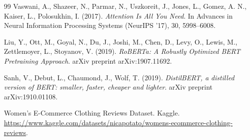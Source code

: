 \begin{thebibliography}{99}
Vaswani, A., Shazeer, N., Parmar, N., Uszkoreit, J., Jones, L., Gomez, A. N., Kaiser, L., Polosukhin, I. (2017). \textit{Attention Is All You Need}. In Advances in Neural Information Processing Systems (NeurIPS '17), 30, 5998--6008.

Liu, Y., Ott, M., Goyal, N., Du, J., Joshi, M., Chen, D., Levy, O., Lewis, M., Zettlemoyer, L., Stoyanov, V. (2019). \textit{RoBERTa: A Robustly Optimized BERT Pretraining Approach}. arXiv preprint arXiv:1907.11692.

Sanh, V., Debut, L., Chaumond, J., Wolf, T. (2019). \textit{DistilBERT, a distilled version of BERT: smaller, faster, cheaper and lighter}. arXiv preprint arXiv:1910.01108.

Women's E-Commerce Clothing Reviews Dataset. Kaggle. \url{https://www.kaggle.com/datasets/nicapotato/womens-ecommerce-clothing-reviews}.
\end{thebibliography}
